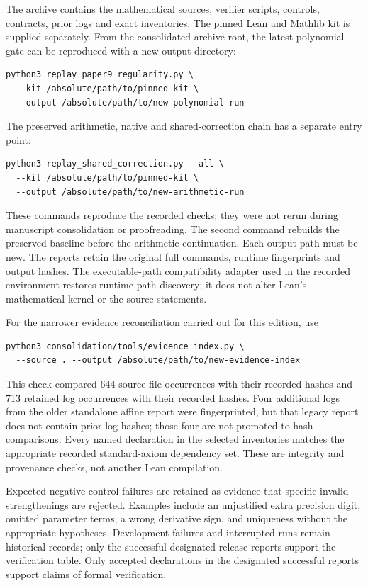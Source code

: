 The archive contains the mathematical sources, verifier scripts, controls,
contracts, prior logs and exact inventories. The pinned Lean and Mathlib kit
is supplied separately. From the consolidated archive root, the latest
polynomial gate can be reproduced with a new output directory:
\begin{verbatim}
python3 replay_paper9_regularity.py \
  --kit /absolute/path/to/pinned-kit \
  --output /absolute/path/to/new-polynomial-run
\end{verbatim}
The preserved arithmetic, native and shared-correction chain has a separate
entry point:
\begin{verbatim}
python3 replay_shared_correction.py --all \
  --kit /absolute/path/to/pinned-kit \
  --output /absolute/path/to/new-arithmetic-run
\end{verbatim}
These commands reproduce the recorded checks; they were not rerun during
manuscript consolidation or proofreading. The second command rebuilds
the preserved baseline before the arithmetic continuation. Each output path
must be new. The reports retain the original full commands, runtime
fingerprints and output hashes. The executable-path compatibility adapter
used in the recorded environment restores runtime path discovery; it does
not alter Lean's mathematical kernel or the source statements.

For the narrower evidence reconciliation carried out for this edition, use
\begin{verbatim}
python3 consolidation/tools/evidence_index.py \
  --source . --output /absolute/path/to/new-evidence-index
\end{verbatim}
This check compared 644 source-file occurrences with their recorded hashes
and 713 retained log occurrences with their recorded hashes. Four additional
logs from the older standalone affine report were fingerprinted, but that
legacy report does not contain prior log hashes; those four are not promoted
to hash comparisons. Every named declaration in the selected inventories
matches the appropriate recorded standard-axiom dependency set. These are
integrity and provenance checks, not another Lean compilation.

Expected negative-control failures are retained as evidence that specific
invalid strengthenings are rejected. Examples include an unjustified extra
precision digit, omitted parameter terms, a wrong derivative sign, and
uniqueness without the appropriate hypotheses. Development failures and
interrupted runs remain historical records; only the successful designated
release reports support the verification table. Only accepted declarations in the designated successful reports support
claims of formal verification.

